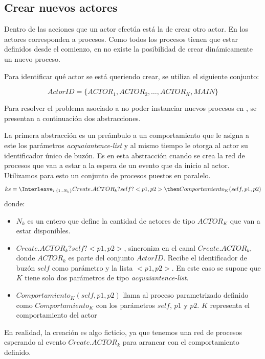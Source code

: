 \subsection{Crear nuevos actores}\label{modelo:crear}

Dentro de las acciones que un actor efectúa está la de crear otro actor. En \CSP los actores corresponden a procesos. Como todos los procesos tienen que estar definidos desde el comienzo, en \CSP no existe la posibilidad de crear dinámicamente un nuevo proceso.

Para identificar qué actor se está queriendo crear, se utiliza el siguiente conjunto: 

\begin{equation}\label{eq:actorid}
  ActorID = \Big\{ ACTOR_1, ACTOR_2, \ldots, ACTOR_K, MAIN \Big\}
\end{equation}

Para resolver el problema asociado a no poder instanciar nuevos procesos en \CSP, se presentan a continuación dos abstracciones.

La primera abstracción es un preámbulo a un comportamiento que le asigna a este los parámetros \textit{acquaiantence-list} y al mismo tiempo le otorga al actor su identificador único de buzón. Es en esta abstracción cuando se crea la red de procesos que van a estar a la espera de un evento que da inicio al actor. Utilizamos para esto un conjunto de procesos puestos en paralelo.
\begin{equation}\label{eq:createactor}
ks = \Interleave_{i: \{1 .. N_k\}} Create.ACTOR_k?self?<p1, p2> \then Comportamiento_K(self, p1, p2) 
\end{equation}
donde:
\begin{itemize}
 \item $N_k$ es un entero que define la cantidad de actores de tipo $ACTOR_K$ que van a estar disponibles.
 \item $Create.ACTOR_k?self?<p1, p2>$, sincroniza en el canal $Create.ACTOR_k$, donde $ACTOR_k$ es parte del conjunto $ActorID$. Recibe el identificador de buzón $self$ como parámetro y la lista $<p1, p2>$. En este caso se supone que $K$ tiene solo dos parámetros de tipo \textit{acquaiantence-list}. 
 \item $Comportamiento_K(self, p1, p2)$ llama al proceso parametrizado definido como $Comportamiento_K$ con los parámetros $self$, $p1$ y $p2$. $K$ representa el comportamiento del actor
\end{itemize}

En realidad, la creación es algo ficticio, ya que tenemos una red de procesos \CSP esperando al evento $Create.ACTOR_k$ para arrancar con el comportamiento definido. 

